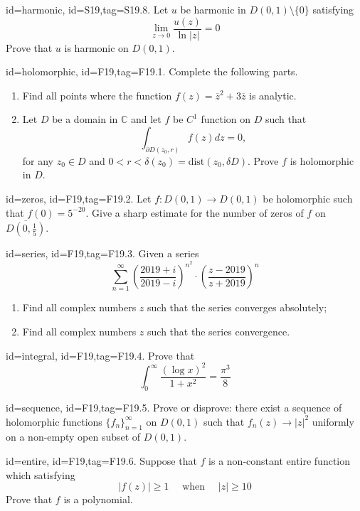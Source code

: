 \documentclass[12pt,letterpaper]{article}
\begin{document}
{\item[id=harmonic, id=S19,tag=S19.8.]
Let $u$ be harmonic in $D(0,1) \setminus \{0\}$ satisfying
\[
	\lim_{z\rightarrow 0} \frac{u(z)}{\ln | z |} = 0
\]
Prove that $u$ is harmonic on $D(0,1)$.


\item[id=holomorphic, id=F19,tag=F19.1.]
Complete the following parts.
\begin{enumerate}[label=(\alph*)]\onlyitems
\item Find all points where the function $f(z) = \overline{z}^2 + 3 \overline{z}$ is analytic.
\item Let $D$ be a domain in $\mathbb{C}$ and let $f$ be $C^1$ function on $D$ such that
\[
	\int_{\partial D(z_0, r)} f(z) dz = 0,
\]
for any $z_0 \in D$ and $0 < r < \delta(z_0) = \text{dist}(z_0, \delta D)$. Prove $f$ is holomorphic in $D$.
\end{enumerate}

\item[id=zeros, id=F19,tag=F19.2.]
Let $f : D(0,1) \rightarrow D(0,1)$ be holomorphic such that $f(0) = 5^{-20}$. Give a sharp estimate for the number of zeros of $f$ on $\overline{D(0,\frac{1}{5})}$.

\item[id=series, id=F19,tag=F19.3.]
Given a series
\[
	\sum_{n=1}^{\infty} \left(\frac{2019 + i}{2019 - i}\right)^{n^2} \cdot \left(\frac{z - 2019}{z + 2019}\right)^n
\]
\begin{enumerate}[label=(\roman*)]\onlyitems
\item Find all complex numbers $z$ such that the series converges absolutely;
\item Find all complex numbers $z$ such that the series convergence.
\end{enumerate}

\item[id=integral, id=F19,tag=F19.4.]
Prove that
\[
	\int_{0}^{\infty} \frac{(\log x)^2}{1 + x^2} = \frac{\pi^3}{8}
\]

\item[id=sequence, id=F19,tag=F19.5.]
Prove or disprove: there exist a sequence of holomorphic functions $\{f_n\}_{n=1}^{\infty}$ on $D(0,1)$ such that $f_n(z) \rightarrow | z |^2$ uniformly on a non-empty open subset of $D(0,1)$.

\item[id=entire, id=F19,tag=F19.6.]
Suppose that $f$ is a non-constant entire function which satisfying
\[
	| f(z) | \ge 1 \quad \text{ when } \quad | z | \ge 10
\]
Prove that $f$ is a polynomial.

}
\end{document}
